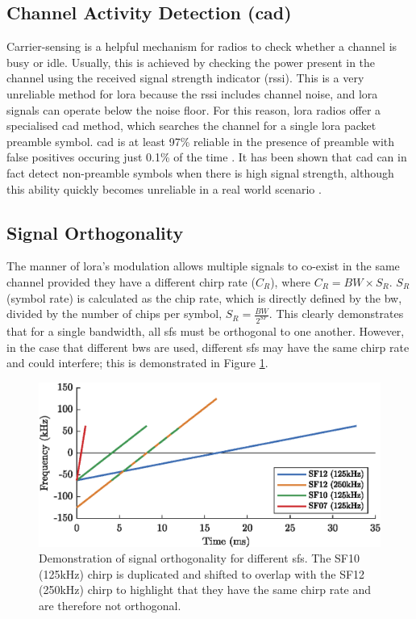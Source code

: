 \subsection{Channel Activity Detection (\ac{cad})}\label{sec:cad}
Carrier-sensing is a helpful mechanism for radios to check whether a channel is busy or idle. Usually, this is achieved by checking the power present in the channel using the received signal strength indicator (\ac{rssi}). This is a very unreliable method for \ac{lora} because the \ac{rssi} includes channel noise, and \ac{lora} signals can operate below the noise floor. For this reason, \ac{lora} radios offer a specialised \ac{cad} method, which searches the channel for a single \ac{lora} packet preamble symbol. \ac{cad} is at least 97\% reliable in the presence of preamble with false positives occuring just 0.1\% of the time \cite{3YP:LORA_FOR_IOT}. It has been shown that \ac{cad} can in fact detect non-preamble symbols when there is high signal strength, although this ability quickly becomes unreliable in a real world scenario \cite{3YP:LORA_CSMA}.

\subsection{Signal Orthogonality}
The manner of \ac{lora}'s modulation allows multiple signals to co-exist in the same channel provided they have a different chirp rate ($C_R$), where $C_R = BW \times S_R$. $S_R$ (symbol rate) is calculated as the chip rate, which is directly defined by the \ac{bw}, divided by the number of chips per symbol, $S_R=\frac{BW}{2^{SF}}$. This clearly demonstrates that for a single bandwidth, all \ac{sf}s must be orthogonal to one another. However, in the case that different \ac{bw}s are used, different \ac{sf}s may have the same chirp rate and could interfere; this is demonstrated in Figure \ref{fig:orthogonality}.

\begin{figure}[H]
    \centering
   	\includegraphics{Figures/sf_orthogonality_plot.eps}
    \caption[Signal chirp rate orthogonality]{
    Demonstration of signal orthogonality for different \ac{sf}s. The SF10 (125kHz) chirp is duplicated and shifted to overlap with the  SF12 (250kHz) chirp to highlight that they have the same chirp rate and are therefore not orthogonal.
    }
    \label{fig:orthogonality}
\end{figure}

